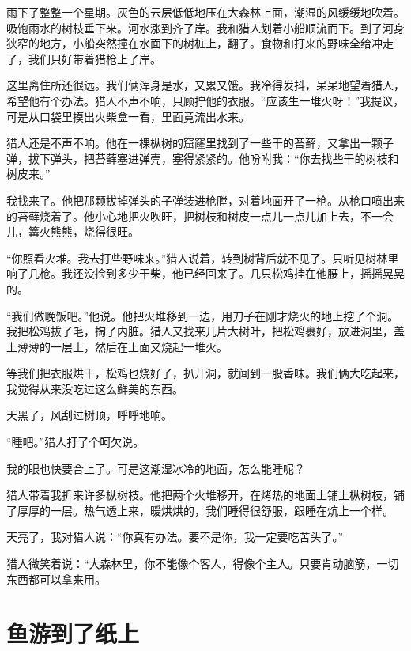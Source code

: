 \documentclass[12pt,UTF-8,openany]{ctexbook}
\begin{document}
\begin{Large}
    
    雨下了整整一个星期。灰色的云层低低地压在大森林上面，潮湿的风缓缓地吹着。吸饱雨水的树枝垂下来。河水涨到齐了岸。我和猎人划着小船顺流而下。到了河身狭窄的地方，小船突然撞在水面下的树桩上，翻了。食物和打来的野味全给冲走了，我们只好带着猎枪上了岸。
    
    这里离住所还很远。我们俩浑身是水，又累又饿。我冷得发抖，呆呆地望着猎人，希望他有个办法。猎人不声不响，只顾拧他的衣服。“应该生一堆火呀！”我提议，可是从口袋里摸出火柴盒一看，里面竟流出水来。
    
    猎人还是不声不响。他在一棵枞树的窟窿里找到了一些干的苔藓，又拿出一颗子弹，拔下弹头，把苔藓塞进弹壳，塞得紧紧的。他吩咐我：“你去找些干的树枝和树皮来。”
    
    我找来了。他把那颗拔掉弹头的子弹装进枪膛，对着地面开了一枪。从枪口喷出来的苔藓烧着了。他小心地把火吹旺，把树枝和树皮一点儿一点儿加上去，不一会儿，篝火熊熊，烧得很旺。
    
    “你照看火堆。我去打些野味来。”猎人说着，转到树背后就不见了。只听见树林里响了几枪。我还没捡到多少干柴，他已经回来了。几只松鸡挂在他腰上，摇摇晃晃的。
    
    “我们做晚饭吧。”他说。他把火堆移到一边，用刀子在刚才烧火的地上挖了个洞。我把松鸡拔了毛，掏了内脏。猎人又找来几片大树叶，把松鸡裹好，放进洞里，盖上薄薄的一层土，然后在上面又烧起一堆火。
    
    等我们把衣服烘干，松鸡也烧好了，扒开洞，就闻到一股香味。我们俩大吃起来，我觉得从来没吃过这么鲜美的东西。
    
    天黑了，风刮过树顶，呼呼地响。
    
    “睡吧。”猎人打了个呵欠说。
    
    我的眼也快要合上了。可是这潮湿冰冷的地面，怎么能睡呢？
    
    猎人带着我折来许多枞树枝。他把两个火堆移开，在烤热的地面上铺上枞树枝，铺了厚厚的一层。热气透上来，暖烘烘的，我们睡得很舒服，跟睡在炕上一个样。
    
    天亮了，我对猎人说：“你真有办法。要不是你，我一定要吃苦头了。”
    
    猎人微笑着说：“大森林里，你不能像个客人，得像个主人。只要肯动脑筋，一切东西都可以拿来用。
    
\end{Large}

\chapter{鱼游到了纸上}
\end{document}
